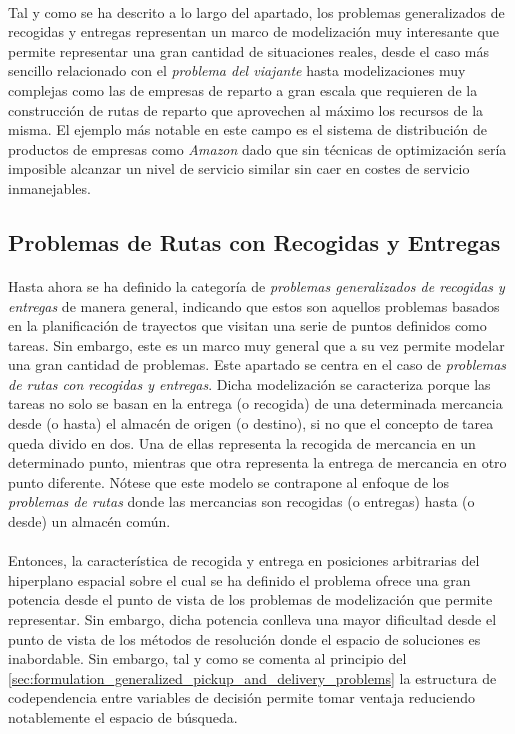 \documentclass{subfiles}
\begin{document}
        \paragraph{}
        Tal y como se ha descrito a lo largo del apartado, los problemas generalizados de recogidas y entregas representan un marco de modelización muy interesante que permite representar una gran cantidad de situaciones reales, desde el caso más sencillo relacionado con el \emph{problema del viajante} hasta modelizaciones muy complejas como las de empresas de reparto a gran escala que requieren de la construcción de rutas de reparto que aprovechen al máximo los recursos de la misma. El ejemplo más notable en este campo es el sistema de distribución de productos de empresas como \emph{Amazon} dado que sin técnicas de optimización sería imposible alcanzar un nivel de servicio similar sin caer en costes de servicio inmanejables.

      \subsection{Problemas de Rutas con Recogidas y Entregas}
      \label{sec:formulation_routing_pickup_and_delivery_problems}

        \paragraph{}
        Hasta ahora se ha definido la categoría de \emph{problemas generalizados de recogidas y entregas} de manera general, indicando que estos son aquellos problemas basados en la planificación de trayectos que visitan una serie de puntos definidos como tareas. Sin embargo, este es un marco muy general que a su vez permite modelar una gran cantidad de problemas. Este apartado se centra en el caso de \emph{problemas de rutas con recogidas y entregas}. Dicha modelización se caracteriza porque las tareas no solo se basan en la entrega (o recogida) de una determinada mercancia  desde (o hasta) el almacén de origen (o destino), si no que el concepto de tarea queda divido en dos. Una de ellas representa la recogida de mercancia en un determinado punto, mientras que otra representa la entrega de mercancia en otro punto diferente. Nótese que este modelo se contrapone al enfoque de los \emph{problemas de rutas} donde las mercancias son recogidas (o entregas) hasta (o desde) un almacén común.

        \paragraph{}
        Entonces, la característica de recogida y entrega en posiciones arbitrarias del hiperplano espacial sobre el cual se ha definido el problema ofrece una gran potencia desde el punto de vista de los problemas de modelización que permite representar. Sin embargo, dicha potencia conlleva una mayor dificultad desde el punto de vista de los métodos de resolución donde el espacio de soluciones es inabordable. Sin embargo, tal y como se comenta al principio del \cref{sec:formulation_generalized_pickup_and_delivery_problems} la estructura de codependencia entre variables de decisión permite tomar ventaja reduciendo notablemente el espacio de búsqueda.
\end{document}
